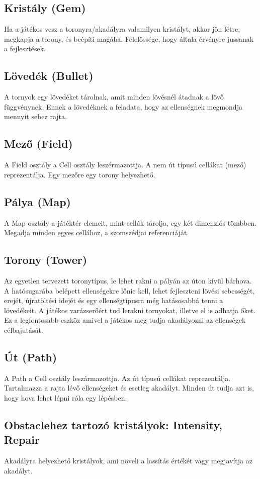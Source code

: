 \subsection{Kristály (Gem)}
	Ha a játékos vesz a toronyra/akadályra valamilyen kristályt, akkor jön létre, megkapja a torony, és beépíti magába. Felelőssége, hogy általa érvényre jussanak a fejlesztések.
\subsection{Lövedék (Bullet)}
	A tornyok egy lövedéket tárolnak, amit minden lövésnél átadnak a lövő függvénynek. Ennek a lövedéknek a feladata, hogy az ellenségnek megmondja mennyit sebez rajta.
\subsection{Mező (Field)}
A Field osztály a Cell osztály leszérmazottja. A nem út típusú cellákat (mező) reprezentálja. Egy mezőre egy torony helyezhető. 

\subsection{Pálya (Map)}
A Map osztály a játéktér elemeit, mint cellák tárolja, egy két dimenziós tömbben. Megadja minden egyes cellához, a szomszédjai referenciáját. 




\subsection{Torony (Tower)}
	Az egyetlen tervezett toronytípus, le lehet rakni a pályán az úton kívül bárhova. A hatósugarába belépett ellenségekre lőnie kell, lehet fejleszteni lövési sebességét, erejét, újratöltési idejét és egy ellenségtípusra még hatásosabbá tenni a lövedékeit. A játékos varázserőért tud lerakni tornyokat, illetve el is adhatja őket. Ez a legfontosabb eszköz amivel a játékos meg tudja akadályozni az ellenségek célbajutását.
\subsection{Út (Path)}
A Path a Cell osztály leszármazottja. Az út típusú cellákat reprezentálja. Tartalmazza a rajta lévő ellenségeket és esetleg akadályt. Minden út tudja azt is, hogy hova lehet lépni róla egy lépésben.

\subsection{Obstaclehez tartozó kristályok: Intensity, Repair}
Akadályra helyezhető kristályok, ami növeli a lassítás értékét vagy megjavítja az akadályt.

